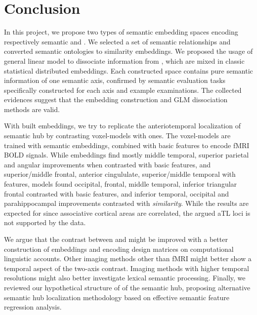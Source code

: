 \chapter{Conclusion} %

\label{chap:conclusion} 

In this project, we propose two types of semantic embedding spaces encoding respectively semantic \similarity and \association. We selected a set of \similarity semantic relationships and converted semantic ontologies to similarity embeddings. We proposed the usage of general linear model to dissociate \similarity information from \association, which are mixed in classic statistical distributed embeddings. Each constructed space contains pure semantic information of one semantic axis, confirmed by semantic evaluation tasks specifically constructed for each axis and example examinations. The collected evidences suggest that the \similarity embedding construction and GLM dissociation methods are valid.

With built embeddings, we try to replicate the anteriotemporal localization of semantic hub by contrasting \similarity voxel-models with \association ones. The voxel-models are trained with semantic embeddings, combined with basic features to encode fMRI BOLD signals. While \similarity embeddings find mostly middle temporal, superior parietal and angular improvements when contrasted with basic features, and superior/middle frontal, anterior cingululate, superior/middle temporal with \association features, \association models found occipital, frontal, middle temporal, inferior triangular frontal contrasted with basic features, and inferior temporal, occipital and parahippocampal improvements contrasted with \emph{similarity}. While the results are expected for \association since associative cortical areas are correlated, the argued aTL loci is not supported by the data.

We argue that the contrast between \similarity and \association might be improved with a better construction of \similarity embeddings and encoding design matrices on computational linguistic accounts. Other imaging methods other than fMRI might better show a temporal aspect of the two-axis contrast. Imaging methods with higher temporal resolutions might also better investigate lexical semantic processing. Finally, we reviewed our hypothetical structure of \similarity of the semantic hub, proposing alternative semantic hub localization methodology based on effective semantic feature regression analysis.